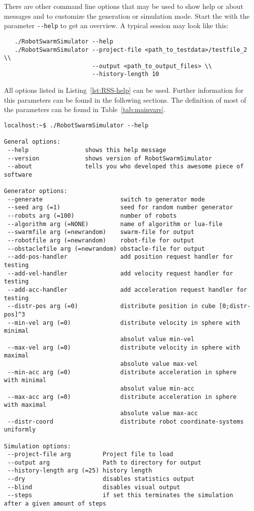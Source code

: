There are other command line options that may be used to show help or about messages and to customize the generation or simulation mode. Start the \RSS with the parameter {\tt -{}-help} to get an overview. A typical session may look like this:

\begin{verbatim}
   ./RobotSwarmSimulator --help
   ./RobotSwarmSimulator --project-file <path_to_testdata>/testfile_2 \\
                         --output <path_to_output_files> \\
                         --history-length 10
\end{verbatim}

All options listed in Listing~\ref{lst:RSS-help} can be used. Further information for this parameters can be found in the following sections. The definition of most of the parameters can be found in Table~\ref{tab:mainvars}.

\begin{lstlisting}[caption={\RSS Helpline},label=lst:RSS-help]
localhost:~$ ./RobotSwarmSimulator --help

General options:
 --help                shows this help message
 --version             shows version of RobotSwarmSimulator
 --about               tells you who developed this awesome piece of software

Generator options:
 --generate                      switch to generator mode
 --seed arg (=1)                 seed for random number generator
 --robots arg (=100)             number of robots
 --algorithm arg (=NONE)         name of algorithm or lua-file
 --swarmfile arg (=newrandom)    swarm-file for output
 --robotfile arg (=newrandom)    robot-file for output
 --obstaclefile arg (=newrandom) obstacle-file for output
 --add-pos-handler               add position request handler for testing
 --add-vel-handler               add velocity request handler for testing
 --add-acc-handler               add acceleration request handler for testing
 --distr-pos arg (=0)            distribute position in cube [0;distr-pos]^3
 --min-vel arg (=0)              distribute velocity in sphere with minimal  
                                 absolut value min-vel
 --max-vel arg (=0)              distribute velocity in sphere with maximal
                                 absolute value max-vel
 --min-acc arg (=0)              distribute acceleration in sphere with minimal  
                                 absolut value min-acc
 --max-acc arg (=0)              distribute acceleration in sphere with maximal
                                 absolute value max-acc
 --distr-coord                   distribute robot coordinate-systems uniformly

Simulation options:
 --project-file arg         Project file to load
 --output arg               Path to directory for output
 --history-length arg (=25) history length
 --dry                      disables statistics output
 --blind                    disables visual output
 --steps                    if set this terminates the simulation after a given amount of steps
\end{lstlisting}


